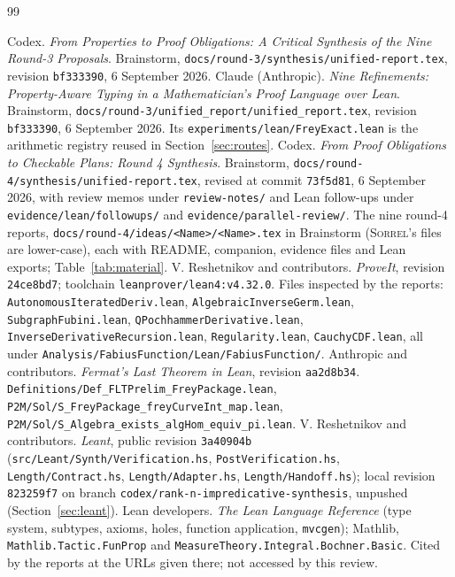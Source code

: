 \documentclass[11pt,a4paper]{article}
\newcommand{\code}[1]{\nolinkurl{#1}}
\newcommand{\So}{\textsc{Sorrel}}
\theoremstyle{definition}
\theoremstyle{plain}
\begin{document}
\clearpage
\begin{thebibliography}{99}\small\raggedright
{} Codex. \emph{From Properties to Proof Obligations: A Critical Synthesis of the Nine Round-3 Proposals}. Brainstorm, \code{docs/round-3/synthesis/unified-report.tex}, revision \code{bf333390}, 6 September 2026.
 Claude (Anthropic). \emph{Nine Refinements: Property-Aware Typing in a Mathematician's Proof Language over Lean}. Brainstorm, \code{docs/round-3/unified_report/unified_report.tex}, revision \code{bf333390}, 6 September 2026. Its \code{experiments/lean/FreyExact.lean} is the arithmetic registry reused in Section~\ref{sec:routes}.
 Codex. \emph{From Proof Obligations to Checkable Plans: Round 4 Synthesis}. Brainstorm, \code{docs/round-4/synthesis/unified-report.tex}, revised at commit \code{73f5d81}, 6 September 2026, with review memos under \code{review-notes/} and Lean follow-ups under \code{evidence/lean/followups/} and \code{evidence/parallel-review/}.
 The nine round-4 reports, \code{docs/round-4/ideas/<Name>/<Name>.tex} in Brainstorm (\So's files are lower-case), each with README, companion, evidence files and Lean exports; Table~\ref{tab:material}.
 V. Reshetnikov and contributors. \emph{ProveIt}, revision \code{24ce8bd7}; toolchain \code{leanprover/lean4:v4.32.0}. Files inspected by the reports: \code{AutonomousIteratedDeriv.lean}, \code{AlgebraicInverseGerm.lean}, \code{SubgraphFubini.lean}, \code{QPochhammerDerivative.lean}, \code{InverseDerivativeRecursion.lean}, \code{Regularity.lean}, \code{CauchyCDF.lean}, all under \code{Analysis/FabiusFunction/Lean/FabiusFunction/}.
 Anthropic and contributors. \emph{Fermat's Last Theorem in Lean}, revision \code{aa2d8b34}. \code{Definitions/Def_FLTPrelim_FreyPackage.lean}, \code{P2M/Sol/S_FreyPackage_freyCurveInt_map.lean}, \code{P2M/Sol/S_Algebra_exists_algHom_equiv_pi.lean}.
 V. Reshetnikov and contributors. \emph{Leant}, public revision \code{3a40904b} (\code{src/Leant/Synth/Verification.hs}, \code{PostVerification.hs}, \code{Length/Contract.hs}, \code{Length/Adapter.hs}, \code{Length/Handoff.hs}); local revision \code{823259f7} on branch \code{codex/rank-n-impredicative-synthesis}, unpushed (Section~\ref{sec:leant}).
 Lean developers. \emph{The Lean Language Reference} (type system, subtypes, axioms, holes, function application, \code{mvcgen}); Mathlib, \code{Mathlib.Tactic.FunProp} and \code{MeasureTheory.Integral.Bochner.Basic}. Cited by the reports at the URLs given there; not accessed by this review.

\end{thebibliography}
\end{document}
